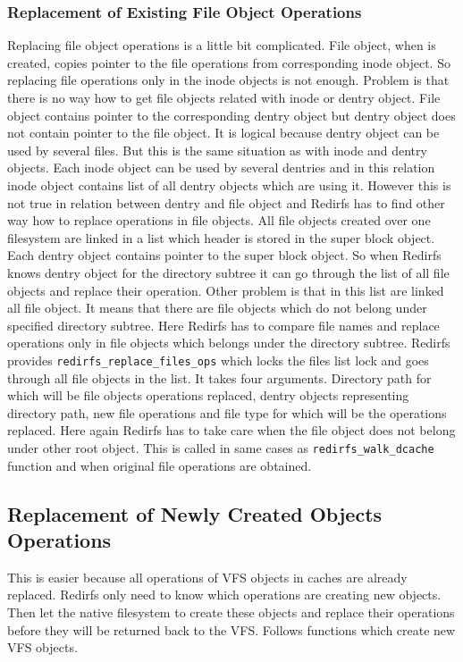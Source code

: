 \subsubsection{Replacement of Existing File Object Operations}
Replacing file object operations is a little bit complicated. File object, when is
created, copies pointer to the file operations from corresponding inode object. So
replacing file operations only in the inode objects is not enough. Problem is that
there is no way how to get file objects related with inode or dentry object. File
object contains pointer to the corresponding dentry object but dentry object does not
contain pointer to the file object. It is logical because dentry object can be used by
several files. But this is the same situation as with inode and dentry objects. Each
inode object can be used by several dentries and in this relation inode object
contains list of all dentry objects which are using it. However this is not true in
relation between dentry and file object and Redirfs has to find other way how to
replace operations in file objects. All file objects created over one filesystem are
linked in a list which header is stored in the super block object. Each dentry object
contains pointer to the super block object. So when Redirfs knows dentry object for
the directory subtree it can go through the list of all file objects and replace their
operation. Other problem is that in this list are linked all file object. It means
that there are file objects which do not belong under specified directory subtree.
Here Redirfs has to compare file names and replace operations only in file objects
which belongs under the directory subtree. Redirfs provides
\texttt{redirfs\_replace\_files\_ops} which locks the files list lock and goes through
all file objects in the list. It takes four arguments. Directory path for which will
be file objects operations replaced, dentry objects representing directory path, new
file operations and file type for which will be the operations replaced. Here again
Redirfs has to take care when the file object does not belong under other root object. 
This is called in same cases as \texttt{redirfs\_walk\_dcache} function and when
original file operations are obtained.

\subsection{Replacement of Newly Created Objects Operations}
This is easier because all operations of VFS objects in caches are already replaced.
Redirfs only need to know which operations are creating new objects. Then let the
native filesystem to create these objects and replace their operations before they
will be returned back to the VFS. Follows functions which create new VFS objects.

